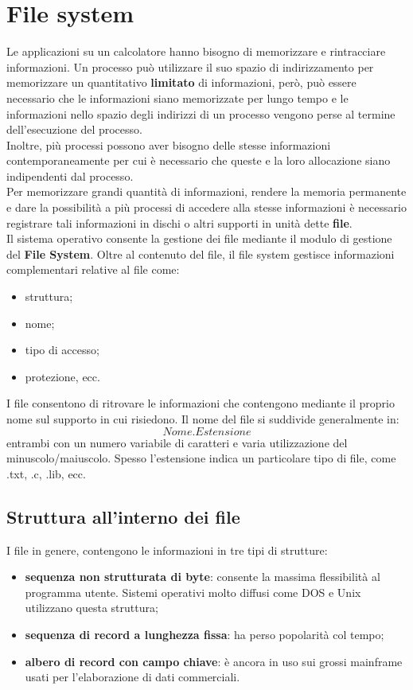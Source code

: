 \documentclass[12pt, letterpaper]{report}
\begin{document}
	\chapter{File system}
	Le applicazioni su un calcolatore hanno bisogno di memorizzare e rintracciare informazioni. Un processo può utilizzare il suo spazio di indirizzamento per memorizzare un quantitativo \textbf{limitato} di informazioni, però, può essere necessario che le informazioni siano memorizzate per lungo tempo e le informazioni nello spazio degli indirizzi di un processo vengono perse al termine dell'esecuzione del processo. \\
	Inoltre, più processi possono aver bisogno delle stesse informazioni contemporaneamente per cui è necessario che queste e la loro allocazione siano indipendenti dal processo. \\
	Per memorizzare grandi quantità di informazioni, rendere la memoria permanente e dare la possibilità a più processi di accedere alla stesse informazioni è necessario registrare tali informazioni in dischi o altri supporti in unità dette \textbf{file}. 	\\
	Il sistema operativo consente la gestione dei file mediante il modulo di gestione del \textbf{File System}. Oltre al contenuto del file, il file system gestisce informazioni complementari relative al file come:
	\begin{itemize}
		\item struttura;
		\item nome;
		\item tipo di accesso;
		\item protezione, ecc.
	\end{itemize}
	I file consentono di ritrovare le informazioni che contengono mediante il proprio nome sul supporto in cui risiedono. Il nome del file si suddivide generalmente in:
	\[Nome.Estensione\]
	entrambi con un numero variabile di caratteri e varia utilizzazione del minuscolo/maiuscolo.
	Spesso l'estensione indica un particolare tipo di file, come .txt, .c, .lib, ecc. \\
	\section{Struttura all'interno dei file}
	I file in genere, contengono le informazioni in tre tipi di strutture:
	\begin{itemize}
		\item \textbf{sequenza non strutturata di byte}: consente la massima flessibilità al programma utente. Sistemi operativi molto diffusi come DOS e Unix utilizzano questa struttura;
		\item \textbf{sequenza di record a lunghezza fissa}: ha perso popolarità col tempo;
		\item \textbf{albero di record con campo chiave}: è ancora in uso sui grossi mainframe usati per l'elaborazione di dati commerciali.
	\end{itemize}
\end{document}
